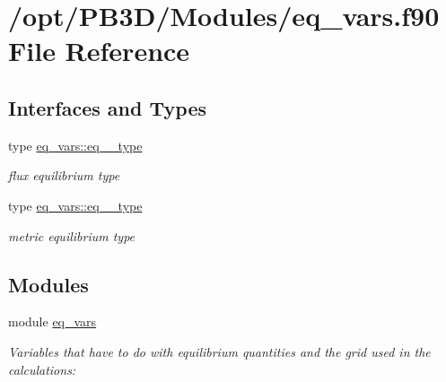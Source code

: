 \hypertarget{eq__vars_8f90}{}\section{/opt/\+P\+B3\+D/\+Modules/eq\+\_\+vars.f90 File Reference}
\label{eq__vars_8f90}
\subsection*{Interfaces and Types}
\begin{DoxyCompactItemize}
\item 
type \hyperlink{structeq__vars_1_1eq__1__type}{eq\+\_\+vars\+::eq\+\_\+\_\+type}
\begin{DoxyCompactList}\small\item\em flux equilibrium type \end{DoxyCompactList}\item 
type \hyperlink{structeq__vars_1_1eq__2__type}{eq\+\_\+vars\+::eq\+\_\+\_\+type}
\begin{DoxyCompactList}\small\item\em metric equilibrium type \end{DoxyCompactList}\end{DoxyCompactItemize}
\subsection*{Modules}
\begin{DoxyCompactItemize}
\item 
module \hyperlink{namespaceeq__vars}{eq\+\_\+vars}
\begin{DoxyCompactList}\small\item\em Variables that have to do with equilibrium quantities and the grid used in the calculations\+: \end{DoxyCompactList}\end{DoxyCompactItemize}
